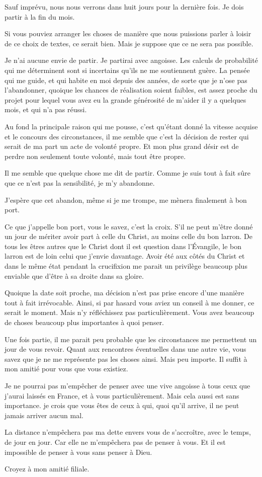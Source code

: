 \documentclass[french,twoside]{book} %
\newcommand\chaptercont{} %
\begin{document}
\chaptercont
\noindent Sauf imprévu, nous nous verrons dans huit jours pour la dernière fois. Je dois partir à la fin du mois.\par
Si vous pouviez arranger les choses de manière que nous puissions parler à loisir de ce choix de textes, ce serait bien. Mais je suppose que ce ne sera pas possible.\par
Je n'ai aucune envie de partir. Je partirai avec angoisse. Les calculs de probabilité qui me déterminent sont si incertains qu'ils ne me soutiennent guère. La pensée qui me guide, et qui habite en moi depuis des années, de sorte que je n'ose pas l'abandonner, quoique les chances de réalisation soient faibles, est assez proche du projet pour lequel vous avez eu la grande générosité de m'aider il y a quelques mois, et qui n'a pas réussi.\par
Au fond la principale raison qui me pousse, c'est qu'étant donné la vitesse acquise et le concours des circonstances, il me semble que c'est la décision de rester qui serait de ma part un acte de volonté propre. Et mon plus grand désir est de perdre non seulement toute volonté, mais tout être propre.\par
Il me semble que quelque chose me dit de partir. Comme je suis tout à fait sûre que ce n'est pas la sensibilité, je m'y abandonne.\par
J'espère que cet abandon, même si je me trompe, me mènera finalement à bon port.\par
Ce que j'appelle bon port, vous le savez, c'est la croix. S'il ne peut m'être donné un jour de mériter avoir part à celle du Christ, au moins celle du bon larron. De tous les êtres autres que le Christ dont il est question dans l'Évangile, le bon larron est de loin celui que j'envie davantage. Avoir été aux côtés du Christ et dans le même état pendant la crucifixion me parait un privilège beaucoup plus enviable que d'être à sa droite dans sa gloire.\par
Quoique la date soit proche, ma décision n'est pas prise encore d'une manière tout à fait irrévocable. Ainsi, si par hasard vous aviez un conseil à me donner, ce serait le moment. Mais n'y réfléchissez pas particulièrement. Vous avez beaucoup de choses beaucoup plus importantes à quoi penser.\par
Une fois partie, il me parait peu probable que les circonstances me permettent un jour de vous revoir. Quant aux rencontres éventuelles dans une autre vie, vous savez que je ne me représente pas les choses ainsi. Mais peu importe. Il suffit à mon amitié pour vous que vous existiez.\par
Je ne pourrai pas m'empêcher de penser avec une vive angoisse à tous ceux que j'aurai laissés en France, et à vous particulièrement. Mais cela aussi est sans importance. je crois que vous êtes de ceux à qui, quoi qu'il arrive, il ne peut jamais arriver aucun mal.\par
La distance n'empêchera pas ma dette envers vous de s'accroître, avec le temps, de jour en jour. Car elle ne m'empêchera pas de penser à vous. Et il est impossible de penser à vous sans penser à Dieu.\par
Croyez à mon amitié filiale.\par
\end{document}
